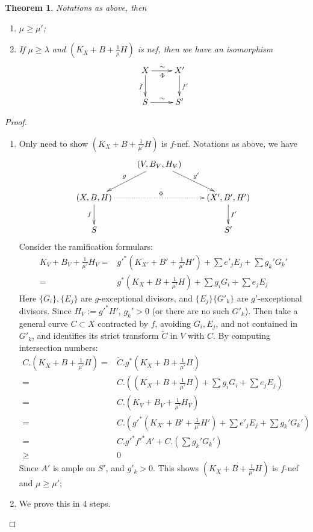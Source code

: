 \documentclass{article}
\newtheorem{thm}[defn]{Theorem}
\begin{document}
\begin{thm}
  Notations as above, then 
  \begin{enumerate}
    \item $ \mu\geqslant \mu' $;
    \item If $ \mu \geqslant \lambda $ and $ (K_X+B+\frac{1}{\mu} H) $ is nef, then we have an isomorphism
    $$ \xymatrix{
    X\ar[r]^\sim_\Phi\ar[d]_f&X'\ar[d]^{f'}\\
    S\ar[r]^\sim& S' } $$
  \end{enumerate}
\end{thm}
\begin{proof}
  \begin{enumerate}
    \item Only need to show $ (K_X+B+\frac{1}{\mu'}H) $ is $ f $-nef. Notations as above, we have
    $$ \xymatrix{
      &(V,B_V,H_V)\ar[dl]_g\ar[dr]^{g'}&\\
      (X,B,H)\ar[d]_f\ar@{.>}[rr]^\Phi&&(X',B',H')\ar[d]^{f'}\\
      S&&S'} $$
  Consider the ramification formulars:
  \begin{equation}
    \begin{aligned} 
      K_V+B_V+\frac{1}{\mu'}H_V=&g'^*(K_{X'}+B'+\frac{1}{\mu'}H')+\sum e'_jE_j+ \sum g_k'G_k'\\
      =&g^*(K_{X}+B+\frac{1}{\mu'}H)+\sum g_iG_i+\sum e_jE_j
    \end{aligned}
  \end{equation}
      Here $ \{G_i\}, \{E_j\} $ are $ g $-exceptional divisors, and $ \{E_j\}\{G'_k\} $ are $ g' $-exceptional divisors. Since $H_V:=g'^*H' $, $ g_k'>0 $ (or there are no such $ G'_k $). Then take a general curve $ C\subset X $ contracted by $ f $,  avoiding $ G_i, E_j $, and not contained in $ G'_k $, and identifies its strict transform $ \tilde{C} $ in $ V $ with $ C $. By computing intersection numbers:
    \begin{equation*}
      \begin{aligned}
        C.(K_X+B+\frac{1}{\mu'}H)=&\tilde{C}.g^*(K_X+B+\frac{1}{\mu'}H)
        \\=&C.((K_X+B+\frac{1}{\mu'}H)+\sum g_iG_i+\sum e_jE_j)\\
        =&C.(K_V+B_V+\frac{1}{\mu'}H_V)\\
        =&C.(g'^*(K_{X'}+B'+\frac{1}{\mu'}H')+\sum e'_jE_j+ \sum g_k'G_k')\\
        =&C.g'^*f'^*A'+C.(\sum g_k'G_k')\\
        \geqslant&0
      \end{aligned}
    \end{equation*}
    Since $ A' $ is ample on $ S' $, and $ g'_k>0 $. This shows $ (K_X+B+\frac{1}{\mu'}H) $ is $ f $-nef and $ \mu\geqslant \mu' $;
    \item We prove this in 4 steps.
    

\end{enumerate}
\end{proof}
\end{document}
